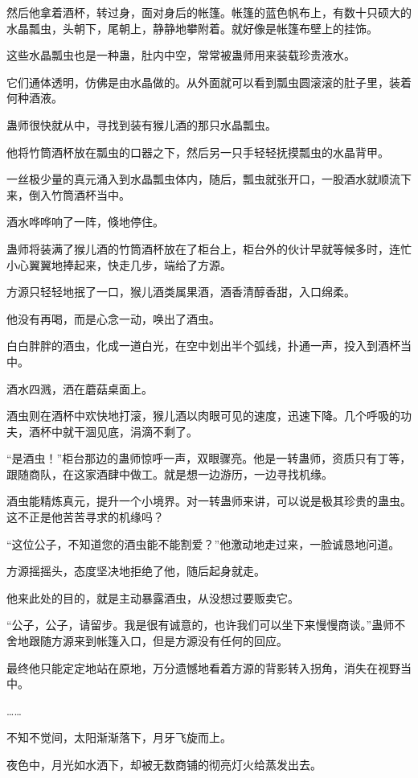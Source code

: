 \begin{this_body}
然后他拿着酒杯，转过身，面对身后的帐篷。帐篷的蓝色帆布上，有数十只硕大的水晶瓢虫，头朝下，尾朝上，静静地攀附着。就好像是帐篷布壁上的挂饰。

这些水晶瓢虫也是一种蛊，肚内中空，常常被蛊师用来装载珍贵液水。

它们通体透明，仿佛是由水晶做的。从外面就可以看到瓢虫圆滚滚的肚子里，装着何种酒液。

蛊师很快就从中，寻找到装有猴儿酒的那只水晶瓢虫。

他将竹筒酒杯放在瓢虫的口器之下，然后另一只手轻轻抚摸瓢虫的水晶背甲。

一丝极少量的真元涌入到水晶瓢虫体内，随后，瓢虫就张开口，一股酒水就顺流下来，倒入竹筒酒杯当中。

酒水哗哗响了一阵，倏地停住。

蛊师将装满了猴儿酒的竹筒酒杯放在了柜台上，柜台外的伙计早就等候多时，连忙小心翼翼地捧起来，快走几步，端给了方源。

方源只轻轻地抿了一口，猴儿酒类属果酒，酒香清醇香甜，入口绵柔。

他没有再喝，而是心念一动，唤出了酒虫。

白白胖胖的酒虫，化成一道白光，在空中划出半个弧线，扑通一声，投入到酒杯当中。

酒水四溅，洒在蘑菇桌面上。

酒虫则在酒杯中欢快地打滚，猴儿酒以肉眼可见的速度，迅速下降。几个呼吸的功夫，酒杯中就干涸见底，涓滴不剩了。

“是酒虫！”柜台那边的蛊师惊呼一声，双眼骤亮。他是一转蛊师，资质只有丁等，跟随商队，在这家酒肆中做工。就是想一边游历，一边寻找机缘。

酒虫能精炼真元，提升一个小境界。对一转蛊师来讲，可以说是极其珍贵的蛊虫。这不正是他苦苦寻求的机缘吗？

“这位公子，不知道您的酒虫能不能割爱？”他激动地走过来，一脸诚恳地问道。

方源摇摇头，态度坚决地拒绝了他，随后起身就走。

他来此处的目的，就是主动暴露酒虫，从没想过要贩卖它。

“公子，公子，请留步。我是很有诚意的，也许我们可以坐下来慢慢商谈。”蛊师不舍地跟随方源来到帐篷入口，但是方源没有任何的回应。

最终他只能定定地站在原地，万分遗憾地看着方源的背影转入拐角，消失在视野当中。

……

不知不觉间，太阳渐渐落下，月牙飞旋而上。

夜色中，月光如水洒下，却被无数商铺的彻亮灯火给蒸发出去。


\end{this_body}
